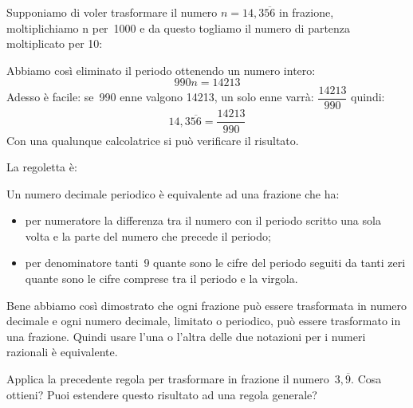 Supponiamo di voler trasformare il numero \(n = 14,3\overline{56}\) in 
frazione, moltiplichiamo n per~1000 e da questo togliamo il numero di 
partenza moltiplicato per 10:

\begin{center}
 \begin{center}\end{center}
\end{center}

Abbiamo così eliminato il periodo ottenendo un numero intero:
\[990n = 14213\]
Adesso è facile: se~990 enne valgono 14213, un solo enne varrà:
\(\dfrac{14213}{990}\)
quindi:
\[14,3\overline{56} = \frac{14213}{990}\]
Con una qualunque calcolatrice si può verificare il risultato.

La regoletta è:

\begin{teorema}
 Un numero decimale periodico è equivalente ad una frazione che ha:
\begin{itemize}
 \item per numeratore la differenza tra il numero con il periodo scritto 
una sola volta e la parte del numero che precede il periodo;
 \item per denominatore tanti~9 quante sono le cifre del periodo seguiti da 
tanti zeri quante sono le cifre comprese tra il periodo e la virgola.
\end{itemize}
\end{teorema}

Bene abbiamo così dimostrato che ogni frazione può essere trasformata in 
numero decimale e ogni numero decimale, limitato o periodico, può essere 
trasformato in una frazione. Quindi usare l'una o l'altra delle due 
notazioni per i numeri razionali è equivalente.

\begin{osservazione}
 Applica la precedente regola per trasformare in frazione il 
 numero~\(3,\overline{9}\). Cosa ottieni? Puoi estendere questo risultato 
ad una regola generale?
\end{osservazione}


